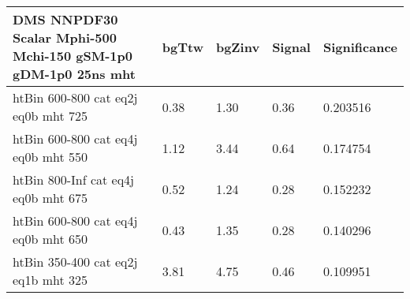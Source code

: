  \begin{tabular}{|l|l|l|l|l|}
\small
   \label{mostSensitiveBins_DMS_NNPDF30_Scalar_Mphi-500_Mchi-150_gSM-1p0_gDM-1p0_25ns}
	\textbf{DMS NNPDF30 Scalar Mphi-500 Mchi-150 gSM-1p0 gDM-1p0 25ns mht}	 & 	bgTtw	 & 	bgZinv	 & 	Signal &	 Significance \\ 
	\hline
	htBin 600-800 cat eq2j eq0b mht 725 & 	0.38	 & 	1.30	 & 	0.36 	&0.203516 \\ 
	htBin 600-800 cat eq4j eq0b mht 550 & 	1.12	 & 	3.44	 & 	0.64 	&0.174754 \\ 
	htBin 800-Inf cat eq4j eq0b mht 675 & 	0.52	 & 	1.24	 & 	0.28 	&0.152232 \\ 
	htBin 600-800 cat eq4j eq0b mht 650 & 	0.43	 & 	1.35	 & 	0.28 	&0.140296 \\ 
	htBin 350-400 cat eq2j eq1b mht 325 & 	3.81	 & 	4.75	 & 	0.46 	&0.109951 \\ 
\end{tabular}
